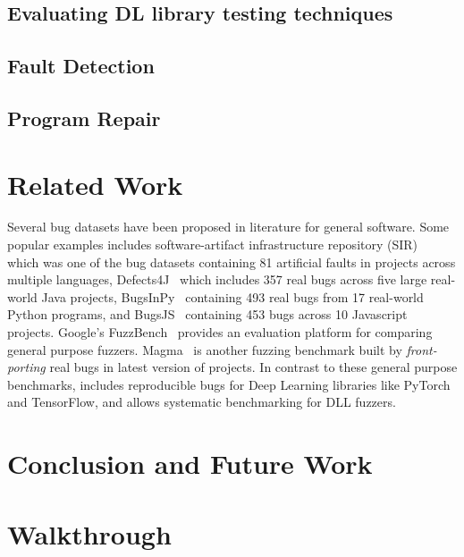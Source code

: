 \documentclass[sigconf,screen]{acmart}
\begin{document}
\subsection{Evaluating DL library testing techniques}
\subsection{Fault Detection}
\subsection{Program Repair}


\section{Related Work} 
Several bug datasets have been proposed in literature for general software. Some
popular examples includes software-artifact infrastructure repository
(SIR)~\cite{do2005supporting} which was one of the bug datasets containing 81
artificial faults in projects across multiple languages,
Defects4J~\cite{just2014defects4j} which includes 357 real bugs across five
large real-world Java projects, BugsInPy~\cite{widyasari2020bugsinpy} containing
493 real bugs from 17 real-world Python programs, and
BugsJS~\cite{vancsics2020relationship} containing 453 bugs across 10 Javascript
projects.
%
Google's FuzzBench~\cite{metzman2021fuzzbench} provides an evaluation platform
for comparing general purpose fuzzers. Magma~\cite{hazimeh2020magma} is another
fuzzing benchmark built by \emph{front-porting} real bugs in latest version of
projects. In contrast to these general purpose benchmarks, \tname includes
reproducible bugs for Deep Learning libraries like PyTorch and TensorFlow, and
allows systematic benchmarking for DLL fuzzers. 


\section{Conclusion and Future Work}





\appendix

\section{Walkthrough}

\Fix{}
\end{document}
